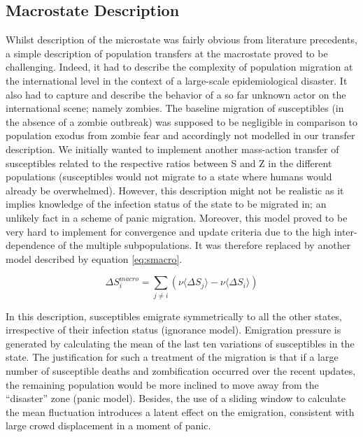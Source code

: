 \documentclass[11pt]{article} %
\begin{document}
\subsection{Macrostate Description}\indent

Whilst description of the microstate was fairly obvious from literature precedents, a simple description of population transfers at the macrostate proved to be challenging. Indeed, it had to describe the complexity of population migration at the international level in the context of a large-scale epidemiological disaster. It also had to capture and describe the behavior of a so far unknown actor on the international scene; namely zombies. The baseline migration of susceptibles (in the absence of a zombie outbreak) was supposed to be negligible in comparison to population exodus from zombie fear and accordingly not modelled in our transfer description. We initially wanted to implement another mass-action transfer of susceptibles related to the respective ratios between S and Z in the different populations (susceptibles would not migrate to a state where humans would already be overwhelmed). However, this description might not be realistic as it implies knowledge of the infection status of the state to be migrated in; an unlikely fact in a scheme of panic migration. Moreover, this model proved to be very hard to implement for convergence and update criteria due to the high inter-dependence of the multiple subpopulations. It was therefore replaced by another model described by equation \eqref{eq:smacro}. 

\bigskip
\begin{equation} \label{eq:smacro}
\Delta S_{i}^{macro} =  \sum_{j\neq i}{ \left( \nu \langle \Delta S_{j} \rangle - \nu  \langle \Delta S_{i} \rangle \right) }
\end{equation}
\bigskip

In this description, susceptibles emigrate symmetrically to all the other states, irrespective of their infection status (ignorance model). Emigration pressure is generated by calculating the mean of the last ten variations of susceptibles in the state. The justification for such a treatment of the migration is that if a large number of susceptible deaths and zombification occurred over the recent updates, the remaining population would be more inclined to move away from the ``disaster'' zone (panic model). Besides, the use of a sliding window to calculate the mean fluctuation introduces a latent effect on the emigration, consistent with large crowd displacement in a moment of panic. 
\end{document}
